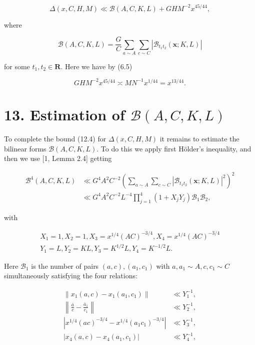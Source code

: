 \documentclass[10pt]{article}
\begin{document}
\begin{equation*}
\Delta(x,C,H,M)\ll\mathscr{B}(A,C,K,L)+G H M^{-2} x^{45 / 44}, \tag{12.4}
\end{equation*}


where

$$
\mathscr{B}(A, C, K, L)=\frac{G}{C} \sum_{a \sim A} \sum_{c \sim C}\left|\mathscr{B}_{t_{1}t_{2}}(\mathbf{x};K,L)\right|
$$

for some $t_{1}, t_{2} \in \mathbf{R}$. Here we have by (6.5)


\begin{equation*}
G H M^{-2} x^{45 / 44} \asymp M N^{-1} x^{1 / 44}=x^{13 / 44} . \tag{12.5}
\end{equation*}


\section*{13. Estimation of $\mathscr{B}(A, C, K, L)$}
To complete the bound (12.4) for $\Delta(x, C, H, M)$ it remains to estimate the bilinear forms $\mathscr{B}(A, C, K, L)$. To do this we apply first Hölder's inequality, and then we use [1, Lemma 2.4] getting

$$
\begin{aligned}
\mathscr{B}^{4}(A,C,K,L) & \ll G^{4} A^{2} C^{-2}\left(\sum_{a \sim A} \sum_{c \sim C}\left|\mathscr{B}_{t_{1} t_{2}}(\mathbf{x} ; K, L)\right|^{2}\right)^{2} \\
& \ll G^{4} A^{2} C^{-2} L^{-4} \prod_{j=1}^{4}\left(1+X_{j} Y_{j}\right) \mathscr{B}_{1}\mathscr{B}_{2},
\end{aligned}
$$

with

$$
\begin{gathered}
X_{1}=1, X_{2}=1, X_{3}=x^{1 / 4}(A C)^{-3 / 4}, X_{4}=x^{1 / 4}(A C)^{-3 / 4} \\
Y_{1}=L, Y_{2}=K L, Y_{3}=K^{1 / 2} L, Y_{4}=K^{-1 / 2} L .
\end{gathered}
$$

Here $\mathscr{B}_{1}$ is the number of pairs $(a, c),\left(a_{1}, c_{1}\right)$ with $a, a_{1} \sim A, c, c_{1} \sim C$ simultaneously satisfying the four relations:


\begin{align*}
\left\|x_{1}(a, c)-x_{1}\left(a_{1}, c_{1}\right)\right\| & \ll Y_{1}^{-1},  \tag{13.1}\\
\left\|\frac{\bar a}{c}-\frac{\bar a_{1}}{c_{1}}\right\| & \ll Y_{2}^{-1},  \tag{13.2}\\
\left|x^{1 / 4}(a c)^{-3 / 4}-x^{1 / 4}\left(a_{1} c_{1}\right)^{-3 / 4}\right| & \ll Y_{3}^{-1},  \tag{13.3}\\
\left|x_{4}(a, c)-x_{4}\left(a_{1}, c_{1}\right)\right| & \ll Y_{4}^{-1}, \tag{13.4}
\end{align*}
\end{document}
